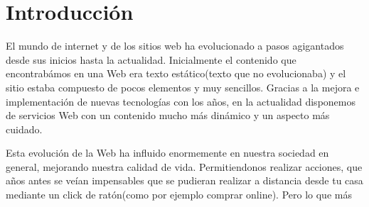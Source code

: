 \chapter{Introducción}

El mundo de internet y de los sitios web ha evolucionado a pasos agigantados desde sus inicios hasta la actualidad. Inicialmente el contenido que encontrabámos en una Web era texto estático(texto que no evolucionaba) y el sitio estaba compuesto de pocos elementos y muy sencillos. Gracias a la mejora e implementación de nuevas tecnologías con los años, en la actualidad disponemos de servicios Web con un contenido mucho más dinámico y un aspecto más cuidado.


Esta evolución de la Web ha influido enormemente en nuestra sociedad en general, mejorando nuestra calidad de vida. Permitiendonos realizar acciones, que años antes se veían impensables que se pudieran realizar a distancia desde tu casa mediante un click de ratón(como por ejemplo comprar online). Pero lo que más






